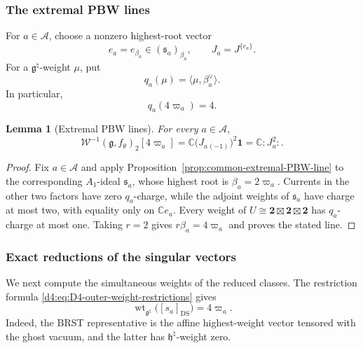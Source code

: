 \documentclass[11pt,reqno]{amsart}
\newtheorem{lemma}[theorem]{Lemma}
\theoremstyle{definition}
\theoremstyle{remark}
\begin{document}
\subsubsection{The extremal PBW lines}


For \(a\in\mathcal A\), choose a nonzero highest-root vector
\begin{equation}
  e_a=e_{\beta_a}\in(\mathfrak s_a)_{\beta_a},
  \qquad
  J_a=J^{\{e_a\}}.
  \label{d4:eq:D4-highest-root-currents}
\end{equation}
For a \(\mathfrak g^\natural\)-weight \(\mu\), put
\begin{equation*}
  q_a(\mu)=\langle\mu,\beta_a^\vee\rangle.
\end{equation*}
In particular,
\begin{equation*}
  q_a(4\varpi_a)=4.
\end{equation*}

\begin{lemma}[Extremal PBW lines]
\label{d4:lem:D4-extremal-PBW-lines}
For every \(a\in\mathcal A\),
\begin{equation*}
  \mathcal W^{-1}(\mathfrak g,f_\theta)_2[4\varpi_a]
  =\mathbb C\bigl(J_a{}_{(-1)}\bigr)^2\mathbf1
  =\mathbb C:J_a^2:.
\end{equation*}
\end{lemma}

\begin{proof}
Fix \(a\in\mathcal A\) and apply
Proposition~\ref{prop:common-extremal-PBW-line} to the corresponding
\(A_1\)-ideal \(\mathfrak s_a\), whose highest root is
\(\beta_a=2\varpi_a\).  Currents in the other two factors have zero
\(q_a\)-charge, while the adjoint weights of \(\mathfrak s_a\) have charge
at most two, with equality only on \(\mathbb Ce_a\).  Every weight of
\(U\cong\mathbf2\boxtimes\mathbf2\boxtimes\mathbf2\) has
\(q_a\)-charge at most one.  Taking \(r=2\) gives
\(r\beta_a=4\varpi_a\) and proves the stated line.
\end{proof}

\subsubsection{Exact reductions of the singular vectors}


We next compute the simultaneous weights of the reduced classes.  The
restriction formula \eqref{d4:eq:D4-outer-weight-restrictions} gives
\begin{equation}
  \operatorname{wt}_{\mathfrak g^\natural}
  \bigl([s_a]_{\mathrm{DS}}\bigr)
  =4\varpi_a.
  \label{d4:eq:D4-reduced-singular-natural-weight}
\end{equation}
Indeed, the BRST representative is the affine highest-weight vector
tensored with the ghost vacuum, and the latter has
\(\mathfrak h^\natural\)-weight zero.
\end{document}

